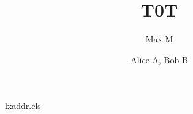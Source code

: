 \begin{filecontents*}[overwrite]{lxaddr.cls}
\def\address#1{\gdef\@address{#1}}
\def\email#1{\gdef\@email{#1}}
\let\@address\@empty
\renewcommand\maketitle{\par{\centering\@title\par\@author\par\@address\par\@email\par}}
\end{filecontents*}
\documentclass{lxaddr}
\address{Shared}

\title{T0}\author{Max M}\maketitle
Text.
\title{T}\author{Alice A, Bob B}\maketitle
Body.

